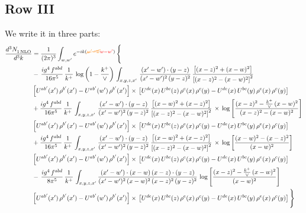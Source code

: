 \documentclass[9pt]{article}
\numberwithin{equation}{section}
\begin{document}
\subsection{Row III}
We write it in three parts:
\begin{align}
   \frac{d^{3}N_{1\,\rm NLO}^{\rm}}{d^{3}k}  & =  \frac{1}{(2\pi)^{3}}  \int_{w, w^\prime} e^{-ik({\color{orange}\cancel{w^\prime-w}}{\color{red}w-w^\prime})}\, \Bigg\{\notag \\
& -\,\frac{ig^{4}\,f^{abd}}{16\pi^{5}}\,\frac{1}{k^{+}}\,\log{\left(1-\frac{k^{+}}{\vee}\right)}\,\int_{x,y,z,x'}\, \frac{(x'-w')\cdot (y-z)}{(x'-w')^{2}\,(y-z)^{2}}\,\frac{\left[(x-z)^{2}+(x-w)^{2}\right]}{\left[(x-z)^{2}-(x-w)^{2}\right]^{2}}\notag \\ & \left[U^{ab'}(x')\,\rho^{b'}(x')-U^{ab'}(w')\, \rho^{b'}(x')\right]\times\, \left[U^{de}(x)\,U^{bc}(z)\, \rho^{e}(x)\,\rho^{c}(y)-U^{de}(x)\,U^{bc}(y)\,\rho^{e}(x)\,\rho^{c}(y)\right] \notag \\
&  +\frac{ig^{4}\,f^{abd}}{16\pi^{5}}\, \frac{1}{k^{+}}\,\int_{x,y,z,x'}\, \frac{(x'-w')\cdot (y-z)}{(x'-w')^{2}\,(y-z)^{2}}\, \frac{\left[(x-w)^{2}+(x-z)^{2}\right]}{\left[(x-z)^{2}-(x-w)^{2}\right]^{2}}\, \times\, \log{\left[\frac{(x-z)^{2}-\frac{k^{+}}{\vee}\,(x-w)^{2}}{(x-z)^{2}-(x-w)^{2}}\right]}\notag \\ & \left[U^{ab'}(x')\,\rho^{b'}(x')-U^{ab'}(w')\, \rho^{b'}(x')\right]\times\, \left[U^{de}(x)\,U^{bc}(z)\, \rho^{e}(x)\,\rho^{c}(y)-U^{de}(x)\,U^{bc}(y)\,\rho^{e}(x)\,\rho^{c}(y)\right] \notag \\
&  +\frac{ig^{4}\,f^{abd}}{16\pi^{5}}\, \frac{1}{k^{+}}\,\int_{x,y,z,x'}\, \frac{(x'-w')\cdot (y-z)}{(x'-w')^{2}\,(y-z)^{2}}\, \frac{\left[(x-w)^{2}+(x-z)^{2}\right]}{\left[(x-z)^{2}-(x-w)^{2}\right]^{2}}\, \times\, \log{\left[\frac{(x-w)^{2}-(x-z)^{2}}{(x-w)^{2}}\right]}\notag \\ & \left[U^{ab'}(x')\,\rho^{b'}(x')-U^{ab'}(w')\, \rho^{b'}(x')\right]\times\, \left[U^{de}(x)\,U^{bc}(z)\, \rho^{e}(x)\,\rho^{c}(y)-U^{de}(x)\,U^{bc}(y)\,\rho^{e}(x)\,\rho^{c}(y)\right] \notag \\
&-\, \frac{ig^{4}\,f^{abd}}{8\pi^{5}}\,\frac{1}{k^{+}}\,\int_{x,y,z,x'}\frac{(x'-w')\cdot (x-w)\, (x-z)\cdot (y-z)}{(x'-w')^{2}\, (x-w)^{2}\, (x-z)^{2}\, (y-z)^{2}}\,\log{\left[\frac{(x-z)^{2}-\frac{k^{+}}{\vee}\,(x-w)^{2}}{(x-w)^{2}}\right]} \notag \\ & \left[U^{ab'}(x')\,\rho^{b'}(x')-U^{ab'}(w')\, \rho^{b'}(x')\right]\times\, \left[U^{de}(x)\,U^{bc}(z)\, \rho^{e}(x)\,\rho^{c}(y)-U^{de}(x)\,U^{bc}(y)\,\rho^{e}(x)\,\rho^{c}(y)\right]\Bigg\}
\end{align}
\end{document}
